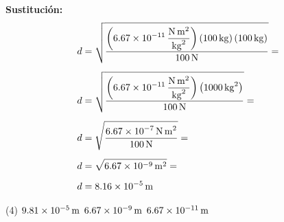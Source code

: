 \documentclass[12pt, letter]{exam}
\begin{document}
\begin{questions}
    \vspace*{0.3cm}
    \textbf{Sustitución:}
    \begin{align*}
    d &= \sqrt{\dfrac{\displaystyle \left( \SI[per-mode=fraction]{6.67d-11}{\newton\square\meter\per\square\kilo\gram} \right) \left( \SI{100}{\kilo\gram} \right) \left(\SI{100}{\kilo\gram}\right)}{\SI{100}{\newton}}} = \\[0.5em]
    d &= \sqrt{\dfrac{\displaystyle \left( \SI[per-mode=fraction]{6.67d-11}{\newton\square\meter\per\square\kilo\gram} \right) \left( \SI{1000}{\square\kilo\gram} \right)}{\SI{100}{\newton}}} = \\[0.5em]
    d &= \sqrt{\dfrac{\displaystyle \SI[per-mode=fraction]{6.67d-7}{\newton\square\meter}}{\SI{100}{\newton}}} = \\[0.5em]
    d &= \sqrt{\SI[per-mode=fraction]{6.67d-9}{\square\meter}} = \\[0.5em]
    d &= \SI{8.16d-5}{\meter}
    \end{align*}
    \begin{tasks}(4)
        \task {}
        \task $\SI{9.81d-5}{\meter}$
        \task $\SI{6.67d-9}{\meter}$
        \task $\SI{6.67d-11}{\meter}$
    \end{tasks}



\end{questions}
\end{document}

